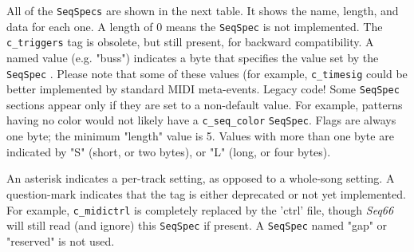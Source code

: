    All of the
   \texttt{SeqSpecs} are shown in the next table. It shows the name, length,
   and data for each one. A length of 0 means the
   \texttt{SeqSpec} is not implemented.
   The \texttt{c\_triggers} tag is obsolete, but still present, for
   backward compatibility.
   A named value (e.g. "buss") indicates a byte that specifies the value set by
   the \texttt{SeqSpec} .
   Please note that some of these values (for example, \texttt{c\_timesig}
   could be better implemented by standard MIDI meta-events. Legacy code!
   Some \texttt{SeqSpec} sections appear only if they are set to a non-default
   value.
   For example, patterns having no color would not likely have a
   \texttt{c\_seq\_color} \texttt{SeqSpec}.
   Flags are always one byte; the minimum "length" value is 5.
   Values with more than one byte are indicated by "S" (short, or two bytes),
   or "L" (long, or four bytes).

   An asterisk indicates a per-track setting, as
   opposed to a whole-song setting. A question-mark indicates that the tag is
   either deprecated or not yet implemented.
   For example, \texttt{c\_midictrl} is completely replaced by the
   'ctrl' file, though \textsl{Seq66} will still read (and ignore)
   this \texttt{SeqSpec} if present.
   A \texttt{SeqSpec} named "gap" or "reserved" is not used.

